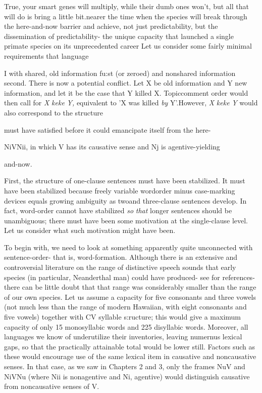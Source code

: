 True, your smart genes will multiply, while their dumb ones won't, but all that will do is bring a little bit.nearer the time when the species will break through the here-and-now barrier and achieve, not just
predictability, but the dissemination of predictability- the unique capacity that launched a single primate species on its unprecedented
career
Let us consider some fairly minimal requirements that language

I
with shared, old information fu:st (or zeroed) and nonshared informa\-tion second. There is now a potential conflict. Let X be old information and Y new information, and let it be the case that Y killed X. Topic\-comment order would then call for \textit{X} \textit{keke} \textit{Y,} equivalent to 'X was killed \textit{by} Y'.However, \textit{X} \textit{keke} \textit{Y} would also correspond to the structure

must
have satisfied before it could emancipate itself from the here-

NiVNii, in which V has its causative sense and Nj is agentive-yielding

and-now.

First, the structure of one-clause sentences must have been
stabilized. It must have been stabilized because freely variable word\-order minus case-marking devices equals growing ambiguity as two\-and three-clause sentences develop. In fact, word-order cannot have stabilized \textit{so} \textit{that} longer sentences should be unambiguous; there must have been some motivation at the single-clause level. Let us consider what such motivation might have been.

To begin with, we need to look at something apparently quite
unconnected with sentence-order- that is, word-formation. Although there is an extensive and controversial literature on the range of distinc\-tive speech sounds that early species (in particular, Neanderthal man) could have produced- see \citet{Spuhler1977} for references-there can be little doubt that that range was considerably smaller than the range of our own species. Let us assume a capacity for five consonants and three vowels (not much less than the range of modern Hawaiian, with eight consonants and five vowels) together with CV syllable s:ructure; this would give a maximum capacity of only 15 monosyllabic words and 225 disyllabic words. Moreover, all languages we know of under\-utilize their inventories, leaving numernus lexical gaps, so that the practically attainable total would be lower still. Factors such as these would encourage use of the same lexical item in causative and non\-causative senses. In that case, as we saw in Chapters 2 and 3, only the frames NuV and NiVNu (where Nii is nonagentive and Ni, agentive) would distinguish causative from noncausative senses of V.

